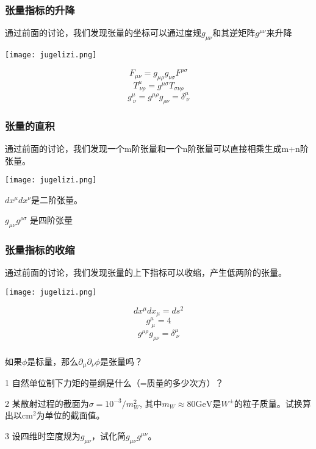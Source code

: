 \documentclass[CJK]{beamer}
\begin{document}
\begin{frame}
\frametitle{\bch 张量指标的升降\ech}
\bch
通过前面的讨论，我们发现张量的坐标可以通过度规$g_{\mu\nu}$和其逆矩阵$g^{\mu\nu}$来升降
\ech
{\vskip 0.1in}

\begin{minipage}{0.3\textwidth}
\texttt{[image: jugelizi.png]}
\end{minipage}
\begin{minipage}{0.6\textwidth}
$$F_{\mu\nu} = g_{\mu\rho}g_{\nu\sigma}F^{\rho\sigma}$$
$$T^{\mu}_{\ \nu\rho} = g^{\mu\sigma} T_{\sigma\nu\rho}$$
$$g^{\mu}_{\ \nu} = g^{\mu\rho}g_{\rho\nu} = \delta^{\mu}_{\ \nu}$$
\end{minipage}
\end{frame}


\begin{frame}
\frametitle{\bch 张量的直积 \ech}
\bch
通过前面的讨论，我们发现一个m阶张量和一个n阶张量可以直接相乘生成m+n阶张量。
\ech
{\vskip 0.1in}

\begin{minipage}{0.3\textwidth}
\texttt{[image: jugelizi.png]}
\end{minipage}
\begin{minipage}{0.6\textwidth}
\bch
$dx^\mu dx^\nu$是二阶张量。

$g_{\mu\nu}g^{\rho\sigma}$ 是四阶张量
\ech
\end{minipage}
\end{frame}



\begin{frame}
\frametitle{\bch 张量指标的收缩\ech}
\bch
通过前面的讨论，我们发现张量的上下指标可以收缩，产生低两阶的张量。
\ech
{\vskip 0.1in}

\begin{minipage}{0.3\textwidth}
\texttt{[image: jugelizi.png]}
\end{minipage}
\begin{minipage}{0.6\textwidth}
$$dx^\mu dx_\mu = ds^2$$
$$g^{\mu}_{\ \mu} = 4$$
$$g^{\mu\rho}g_{\rho\nu} = \delta^{\mu}_{\ \nu}$$
\end{minipage}
\end{frame}



\begin{frame}
\frametitle{\ech}
\bch
{}
如果$\phi$是标量，那么$\partial_\mu\partial_\nu\phi$是张量吗？
\ech
\end{frame}

\begin{frame}
  \bch
  \bitem
\item[1]{自然单位制下力矩的量纲是什么（=质量的多少次方）？}
\item[2]{某散射过程的截面为$\sigma = 10^{-3}/m_W^2$, 其中$m_W \approx 80 \mathrm{GeV}$是$W^{\pm}$的粒子质量。试换算出以$\mathrm{cm}^2$为单位的截面值。}
\item[3]{设四维时空度规为$g_{\mu\nu}$，试化简$g_{\mu\nu}g^{\mu\nu}$。}
  \eitem
  \ech
\end{frame}
\end{document}
